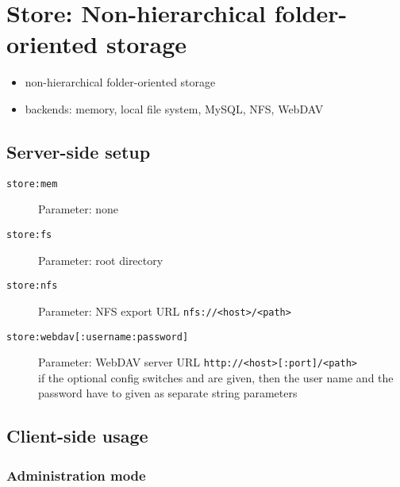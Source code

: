 \section{Store: Non-hierarchical folder-oriented storage}
\label{sect:dataprov_store}

\begin{itemize}
  \item non-hierarchical folder-oriented storage
  \item backends: memory, local file system, MySQL, NFS, WebDAV
\end{itemize}


\subsection{Server-side setup}

\begin{description}
  \item[\texttt{store:mem}] Parameter: none
  \item[\texttt{store:fs}] Parameter: root directory
  \item[\texttt{store:nfs}] Parameter: NFS export URL \texttt{nfs://<host>/<path>}
  \item[\texttt{store:webdav[:username:password]}] Parameter: WebDAV server URL \texttt{http://<host>[:port]/<path>}\\
if the optional config switches  and  are given, then the user name and the password have to given as separate string parameters
\end{description}


\subsection{Client-side usage}

\begin{dscmdref}
\end{dscmdref}


\subsubsection*{Administration mode}

